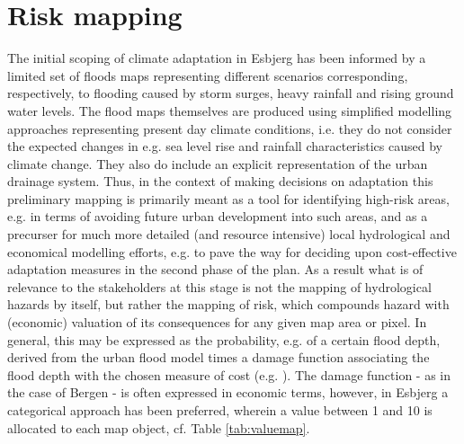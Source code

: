 \documentclass[note,screen,british,11pt]{nrdoc}
\begin{document}
\section{Risk mapping}
\label{decision_tools_PartII}

The initial scoping of climate adaptation in Esbjerg \citep{Esbjerg2014} has been informed by a limited set of floods maps representing different scenarios corresponding, respectively, to flooding caused by storm surges, heavy rainfall and rising ground water levels. The flood maps themselves are produced using simplified modelling approaches representing present day climate conditions, i.e. they do not consider the expected changes in e.g. sea level rise and rainfall characteristics caused by climate change. They also do include an explicit representation of the urban drainage system. Thus, in the context of making decisions on adaptation this preliminary mapping is primarily meant as a tool for identifying high-risk areas, e.g. in terms of avoiding future urban development into such areas, and as a precurser for much more detailed (and resource intensive) local hydrological and economical modelling efforts, e.g. to pave the way for deciding upon cost-effective adaptation measures in the second phase of the plan. As a result what is of relevance to the stakeholders at this stage is not the mapping of hydrological hazards by itself, but rather the mapping of risk, which compounds hazard with (economic) valuation of its consequences for any given map area or pixel. In general, this may be expressed as the probability, e.g. of a certain flood depth, derived from the urban flood model times a damage function associating the flood depth with the chosen measure of cost (e.g. \citet{Halsnaes&2015}). The damage function - as in the case of Bergen - is often expressed in economic terms, however, in Esbjerg a categorical approach has been preferred, wherein a value between 1 and 10 is allocated to each map object, cf. Table \ref{tab:valuemap}.
\end{document}
